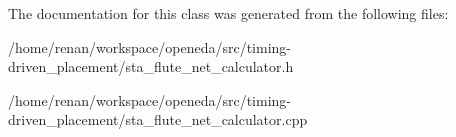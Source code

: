 The documentation for this class was generated from the following files\-:\begin{DoxyCompactItemize}
\item 
/home/renan/workspace/openeda/src/timing-\/driven\-\_\-placement/sta\-\_\-flute\-\_\-net\-\_\-calculator.\-h\item 
/home/renan/workspace/openeda/src/timing-\/driven\-\_\-placement/sta\-\_\-flute\-\_\-net\-\_\-calculator.\-cpp\end{DoxyCompactItemize}
